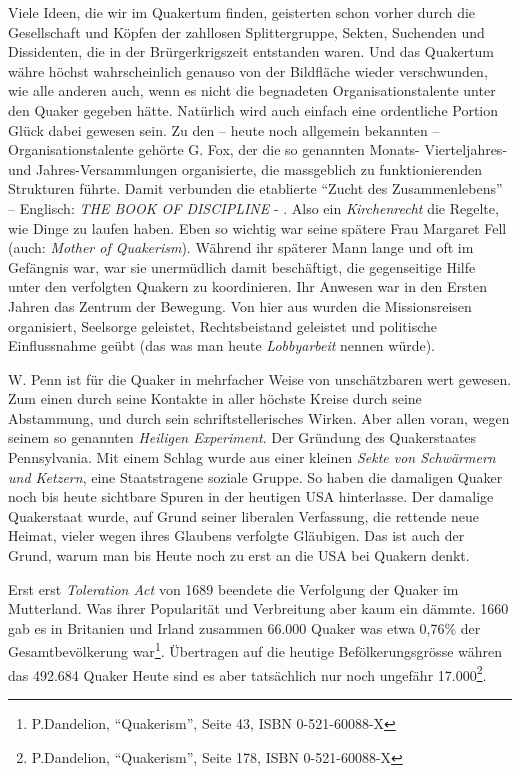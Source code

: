 Viele Ideen, die wir im Quakertum finden, geisterten schon vorher durch die
Gesellschaft und Köpfen der zahllosen Splittergruppe, Sekten, Suchenden und
Dissidenten, die in der Brürgerkrigszeit entstanden waren. Und das Quakertum
währe höchst wahrscheinlich genauso von der Bildfläche wieder verschwunden, wie
alle anderen auch, wenn es nicht die begnadeten Organisationstalente unter den
Quaker gegeben hätte. Natürlich wird auch einfach eine ordentliche Portion Glück
dabei gewesen sein. Zu den -- heute noch allgemein bekannten --
Organisationstalente gehörte G. Fox, der die so genannten Monats- Vierteljahres-
und Jahres-Versammlungen organisierte, die massgeblich zu funktionierenden
Strukturen führte. Damit verbunden die etablierte "`Zucht des Zusammenlebens"'
--
Englisch: \textit{THE BOOK OF DISCIPLINE} - . Also ein \textit{Kirchenrecht} die
Regelte, wie Dinge zu laufen haben. Eben so wichtig war seine spätere Frau
Margaret Fell (auch: \textit{Mother of Quakerism}). Während ihr späterer Mann
lange und oft im Gefängnis war, war sie unermüdlich damit beschäftigt, die
gegenseitige Hilfe unter den verfolgten Quakern zu koordinieren. Ihr Anwesen
war in den Ersten Jahren das Zentrum der Bewegung. Von hier aus wurden die
Missionsreisen organisiert, Seelsorge geleistet, Rechtsbeistand geleistet und
politische Einflussnahme geübt (das was man heute \textit{Lobbyarbeit} nennen
würde).

\medskip

W. Penn ist für die Quaker in mehrfacher Weise von unschätzbaren wert gewesen.
Zum einen durch seine Kontakte in aller höchste Kreise durch seine Abstammung,
und
durch sein schriftstellerisches Wirken. Aber allen voran, wegen seinem so
genannten \textit{Heiligen Experiment}. Der Gründung des Quakerstaates
Pennsylvania. Mit einem Schlag wurde aus einer kleinen \textit{Sekte von
Schwärmern und Ketzern}, eine Staatstragene soziale Gruppe. So haben die
damaligen Quaker noch bis heute sichtbare Spuren in der heutigen USA
hinterlasse.
Der damalige Quakerstaat wurde, auf Grund seiner liberalen Verfassung, die
rettende neue Heimat, vieler wegen ihres Glaubens verfolgte Gläubigen. Das ist
auch der Grund, warum man bis Heute noch zu erst an die USA bei Quakern denkt.

\medskip

Erst erst \textit{Toleration Act} von 1689 beendete die Verfolgung der Quaker im
Mutterland. Was ihrer Popularität und Verbreitung aber kaum ein dämmte. 1660 gab
es in Britanien und Irland zusammen 66.000 Quaker was etwa 0,76\% der
Gesamtbevölkerung war\footnote{P.Dandelion, "`Quakerism"', Seite 43, ISBN
0-521-60088-X}. Übertragen auf die heutige Befölkerungsgrösse währen das 492.684
Quaker Heute sind es aber tatsächlich nur noch ungefähr
17.000\footnote{P.Dandelion, "`Quakerism"', Seite 178, ISBN 0-521-60088-X}.

